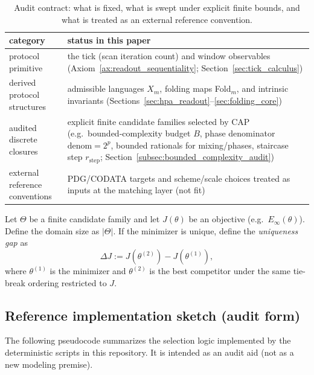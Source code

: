 \begin{table}[t]
\centering
\scriptsize
\setlength{\tabcolsep}{6pt}
\renewcommand{\arraystretch}{1.15}
\begin{tabular}{p{} p{}}
\toprule
category & status in this paper \\
\midrule
protocol primitive & the tick (scan iteration count) and window observables (Axiom~\ref{ax:readout_sequentiality}; Section~\ref{sec:tick_calculus}) \\
derived protocol structures & admissible languages $X_m$, folding maps Fold$_m$, and intrinsic invariants (Sections~\ref{sec:hpa_readout}--\ref{sec:folding_core}) \\
audited discrete closures & explicit finite candidate families selected by CAP (e.g.\ bounded-complexity budget $B$, phase denominator $\mathrm{denom}=2^p$, bounded rationals for mixing/phases, staircase step $r_{\mathrm{step}}$; Section~\ref{subsec:bounded_complexity_audit}) \\
external reference conventions & PDG/CODATA targets and scheme/scale choices treated as inputs at the matching layer (not fit) \\
\bottomrule
\end{tabular}
\caption{Audit contract: what is fixed, what is swept under explicit finite bounds, and what is treated as an external reference convention.}
\label{tab:no_hidden_knobs_contract}
\end{table}

\begin{definition}\label{def:domain_gap}
Let $\Theta$ be a finite candidate family and let $J(\theta)$ be an objective (e.g.\ $E_\infty(\theta)$).
Define the domain size as $|\Theta|$.
If the minimizer is unique, define the \emph{uniqueness gap} as
\[
\Delta J:=J(\theta^{(2)})-J(\theta^{(1)}),
\]
where $\theta^{(1)}$ is the minimizer and $\theta^{(2)}$ is the best competitor under the same tie-break ordering restricted to $J$.
\end{definition}

\subsection{Reference implementation sketch (audit form)}

The following pseudocode summarizes the selection logic implemented by the deterministic scripts in this repository.
It is intended as an audit aid (not as a new modeling premise).

